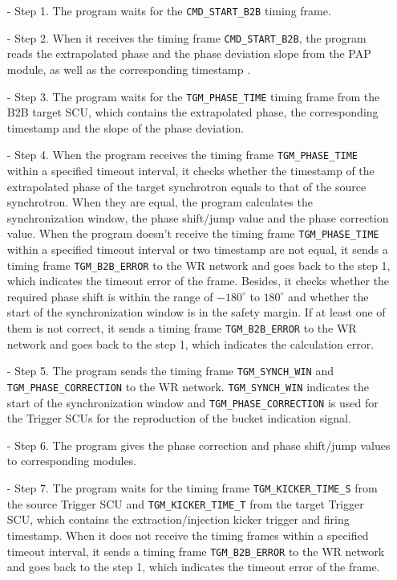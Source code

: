 \begin{itemize}
 	\begin{itemize}
		\item[-]Step 1. The program waits for the \verb|CMD_START_B2B| timing frame.
 		\item[-]Step 2. When it receives the timing frame \verb|CMD_START_B2B|, the program reads the extrapolated phase and the phase deviation slope from the PAP module, as well as the corresponding timestamp .
		\item[-]Step 3. The program waits for the \verb|TGM_PHASE_TIME| timing frame from the B2B target SCU, which contains the extrapolated phase, the corresponding timestamp and the slope of the phase deviation.
		\item[-]Step 4. When the program receives the timing frame \verb|TGM_PHASE_TIME| within a specified timeout interval, it checks whether the timestamp of the extrapolated phase of the target synchrotron equals to that of the source synchrotron. When they are equal, the program calculates the synchronization window, the phase shift/jump value and the phase correction value. When the program doesn't receive the timing frame \verb|TGM_PHASE_TIME| within a specified timeout interval or two timestamp are not equal, it sends a timing frame \verb|TGM_B2B_ERROR| to the WR network and goes back to the step 1, which indicates the timeout error of the frame. Besides, it checks whether the required phase shift is within the range of $-180^\circ$ to $180^\circ$ and whether the start of the synchronization window is in the safety margin. If at least one of them is not correct, it sends a timing frame \verb|TGM_B2B_ERROR| to the WR network and goes back to the step 1, which indicates the calculation error. 
		\item[-]Step 5. The program sends the timing frame \verb|TGM_SYNCH_WIN| and \verb|TGM_PHASE_CORRECTION| to the WR network. \verb|TGM_SYNCH_WIN| indicates the start of the synchronization window and \verb|TGM_PHASE_CORRECTION| is used for the Trigger SCUs for the reproduction of the bucket indication signal.
		\item[-]Step 6. The program gives the phase correction and phase shift/jump values to corresponding modules.
		\item[-]Step 7. The program waits for the timing frame \verb|TGM_KICKER_TIME_S| from the source Trigger SCU and \verb|TGM_KICKER_TIME_T| from the target Trigger SCU, which contains the extraction/injection kicker trigger and firing timestamp. When it does not receive the timing frames within a specified timeout interval, it sends a timing frame \verb|TGM_B2B_ERROR| to the WR network and goes back to the step 1, which indicates the timeout error of the frame.

\end{itemize}
\end{itemize}
